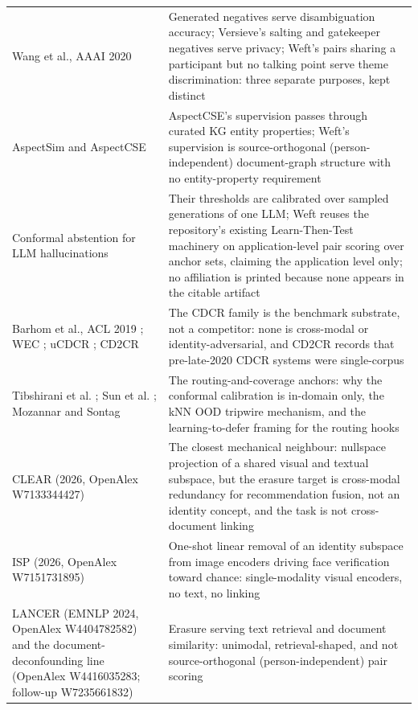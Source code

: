 \documentclass{article}
\begin{document}
\begin{table}[t]
\begin{center}
{\begin{tabular}{p{5.1in}p{3.6in}}
Wang et al., AAAI 2020 \citep{wang2020authorname} & Generated negatives serve disambiguation accuracy; Versieve's salting and gatekeeper negatives serve privacy; Weft's pairs sharing a participant but no talking point serve theme discrimination: three separate purposes, kept distinct \\
AspectSim \citep{hossain2026aspectsim} and AspectCSE \citep{schopf2023aspectcse} & AspectCSE's supervision passes through curated KG entity properties; Weft's supervision is source-orthogonal (person-independent) document-graph structure with no entity-property requirement \\
Conformal abstention for LLM hallucinations \citep{abbasiyadkori2024conformal} & Their thresholds are calibrated over sampled generations of one LLM; Weft reuses the repository's existing Learn-Then-Test machinery on application-level pair scoring over anchor sets, claiming the application level only; no affiliation is printed because none appears in the citable artifact \\
Barhom et al., ACL 2019 \citep{barhom2019revisiting}; WEC \citep{eirew2021wec}; uCDCR \citep{zhukova2026ucdcr}; CD2CR \citep{ravenscroft2021cd2cr} & The CDCR family is the benchmark substrate, not a competitor: none is cross-modal or identity-adversarial, and CD2CR records that pre-late-2020 CDCR systems were single-corpus \\
Tibshirani et al. \citep{tibshirani2019conformal}; Sun et al. \citep{sun2022knnood}; Mozannar and Sontag \citep{mozannar2020defer} & The routing-and-coverage anchors: why the conformal calibration is in-domain only, the kNN OOD tripwire mechanism, and the learning-to-defer framing for the routing hooks \\
CLEAR (2026, OpenAlex W7133344427) \citep{clear2026} & The closest mechanical neighbour: nullspace projection of a shared visual and textual subspace, but the erasure target is cross-modal redundancy for recommendation fusion, not an identity concept, and the task is not cross-document linking \\
ISP (2026, OpenAlex W7151731895) \citep{isp2026} & One-shot linear removal of an identity subspace from image encoders driving face verification toward chance: single-modality visual encoders, no text, no linking \\
LANCER (EMNLP 2024, OpenAlex W4404782582) \citep{lancer2024} and the document-deconfounding line (OpenAlex W4416035283; follow-up W7235661832) \citep{deconfounding2025} & Erasure serving text retrieval and document similarity: unimodal, retrieval-shaped, and not source-orthogonal (person-independent) pair scoring \\

\end{tabular}}
\end{center}
\end{table}
\end{document}
